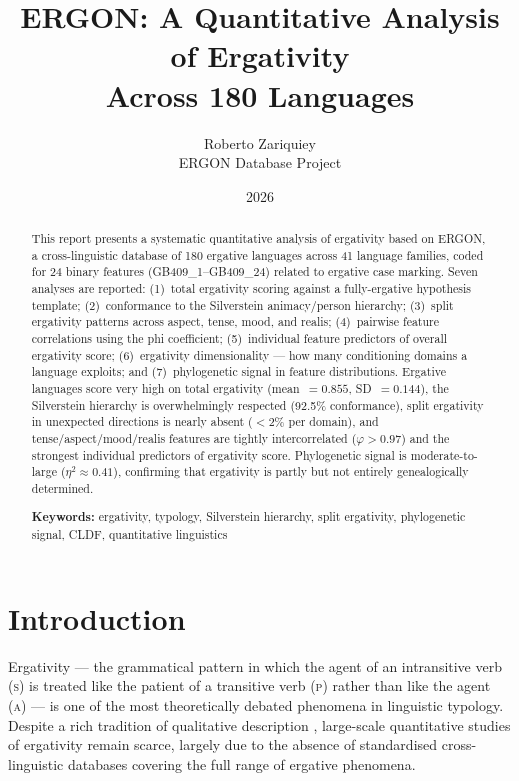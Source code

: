 \documentclass[12pt, a4paper]{article}
\title{\textbf{ERGON: A Quantitative Analysis of Ergativity\\
       Across 180 Languages}}
\author{Roberto Zariquiey\\[4pt]
        \small ERGON Database Project}
\date{2026}
\begin{document}
\maketitle
\thispagestyle{empty}

\begin{abstract}
\noindent
This report presents a systematic quantitative analysis of ergativity based on
ERGON, a cross-linguistic database of 180 ergative languages across 41 language
families, coded for 24 binary features (GB409\_1--GB409\_24) related to ergative
case marking. Seven analyses are reported: (1)~total ergativity scoring against a
fully-ergative hypothesis template; (2)~conformance to the Silverstein
animacy/person hierarchy; (3)~split ergativity patterns across aspect, tense,
mood, and realis; (4)~pairwise feature correlations using the phi coefficient;
(5)~individual feature predictors of overall ergativity score; (6)~ergativity
dimensionality --- how many conditioning domains a language exploits; and
(7)~phylogenetic signal in feature distributions. Ergative languages score very
high on total ergativity (mean~$= 0.855$, SD~$= 0.144$), the Silverstein
hierarchy is overwhelmingly respected (92.5\% conformance), split ergativity in
unexpected directions is nearly absent ($< 2\%$ per domain), and
tense/aspect/mood/realis features are tightly intercorrelated ($\varphi > 0.97$)
and the strongest individual predictors of ergativity score. Phylogenetic signal
is moderate-to-large ($\eta^2 \approx 0.41$), confirming that ergativity is
partly but not entirely genealogically determined.

\medskip\noindent
\textbf{Keywords:} ergativity, typology, Silverstein hierarchy, split ergativity,
phylogenetic signal, CLDF, quantitative linguistics
\end{abstract}

\newpage
\tableofcontents
\newpage

\section{Introduction}

Ergativity --- the grammatical pattern in which the agent of an intransitive verb
(\textsc{s}) is treated like the patient of a transitive verb (\textsc{p}) rather
than like the agent (\textsc{a}) --- is one of the most theoretically debated
phenomena in linguistic typology. Despite a rich tradition of qualitative
description \citep{dixon1994, comrie1978, manning1996}, large-scale quantitative
studies of ergativity remain scarce, largely due to the absence of standardised
cross-linguistic databases covering the full range of ergative phenomena.
\end{document}
